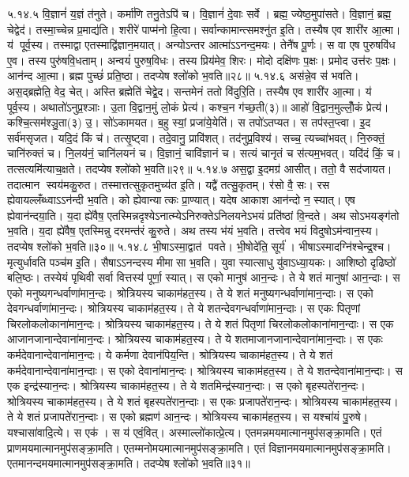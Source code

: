 ५.१४.५
वि॒ज्ञानं॑ य॒ज्ञं त॑नुते। कर्मा॑णि तनु॒तेऽपि॑ च। वि॒ज्ञानं॑ दे॒वाः सर्वे। ब्रह्म॒ ज्येष्ठ॒मुपा॑सते। वि॒ज्ञानं॒ ब्रह्म॒ चेद्वेद॑। तस्मा॒च्चेन्न प्र॒माद्य॑ति। शरीरे॑ पाप्म॑नो हि॒त्वा। सर्वान्कामान्त्समश्नु॑त इ॒ति। तस्यैष एव शारी॑र आ॒त्मा। य॑ पूर्व॒स्य। तस्माद्वा एतस्माद्वि॑ज्ञान॒मयात्। अन्योऽन्तर आत्मा॑ऽऽनन्द॒मयः। तेनै॑ष पू॒र्णः। स वा एष पुरुषवि॑ध ए॒व। तस्य पुरु॑षवि॒धताम्। अन्वयं॑ पुरुष॒विधः। तस्य प्रिय॑मेव॒ शिरः। मोदो दक्षि॑णः प॒क्षः। प्रमोद उत्त॑रः प॒क्षः। आन॑न्द आ॒त्मा। ब्रह्म पुच्छं॑ प्रति॒ष्ठा। तदप्येष श्लो॑को भ॒वति॥२८॥
५.१४.६
अस॑न्ने॒व स॑ भवति। अस॒द्ब्रह्मेति॒ वेद॒ चेत्। अस्ति ब्रह्मेति॑ चेद्वे॒द। सन्तमेनं ततो वि॑दुरि॒ति। तस्यैष एव शारी॑र आ॒त्मा। य॑ पूर्व॒स्य। अथातो॑ऽनुप्र॒श्ञाः। उ॒ता वि॒द्वान॒मुं लो॒कं प्रेत्य॑। कश्च॒न ग॑च्छ॒ती(३)॥ आहो॑ वि॒द्वान॒मुल्लोँ॒कं प्रेत्य॑। कश्चि॒त्सम॑श्ञु॒ता(३) उ॒। सो॑ऽकामयत। ब॒हु स्यां॒ प्रजा॑ये॒येति॑। स तपो॑ऽतप्यत। स तप॑स्त॒प्त्वा। इ॒द सर्व॑मसृजत। यदि॒दं किं च॑। तत्सृ॒ष्ट्वा। तदे॒वानु॒ प्रावि॑शत्। तद॑नुप्र॒विश्य॑। सच्च॒ त्यच्चा॑भवत्। नि॒रुक्तं॒ चानि॑रुक्तं च। नि॒लय॑नं॒ चानि॑लयनं च। वि॒ज्ञानं॒ चावि॑ज्ञानं च। सत्यं चानृतं च स॑त्यम॒भवत्। यदि॑दं किं॒ च। तत्सत्यमि॑त्याच॒क्षते। तदप्येष श्लो॑को भ॒वति॥२९॥
५.१४.७
अस॒द्वा इ॒दमग्र॑ आसीत्। ततो॒ वै सद॑जायत। तदात्मान स्वय॑मकु॒रुत। तस्मात्तत्सुकृतमुच्य॑त इ॒ति। यद्वै॑ तत्सु॒कृतम्। र॑सो वै॒ सः। रस ह्येवायल्लँब्ध्वाऽऽन॑न्दी भ॒वति। को ह्येवान्यात्कः प्रा॒ण्यात्। यदेष आकाश आन॑न्दो न॒ स्यात्। एष ह्येवान॑न्दया॒ति। य॒दा ह्ये॑वैष॒ एतस्मिन्नदृश्येऽनात्म्येऽनिरुक्तेऽनिलयनेऽभयं प्रति॑ष्ठां  वि॒न्दते। अथ सोऽभयङ्ग॑तो भ॒वति। य॒दा ह्ये॑वैष॒ एतस्मिन्नु दरमन्त॑रं कु॒रुते। अथ तस्य भ॑यं भ॒वति। तत्त्वेव भयं  विदुषोऽम॑न्वान॒स्य। तदप्येष श्लो॑को भ॒वति॥३०॥
५.१४.८
भी॒षाऽस्मा॒द्वात॑ पवते। भी॒षोदे॑ति॒ सूर्य॑। भीषाऽस्मादग्नि॑श्चेन्द्र॒श्च। मृत्युर्धावति पञ्च॑म इ॒ति। सैषाऽऽनन्दस्य मीमासा भ॒वति। युवा स्यात्साधु यु॑वाऽध्या॒यकः। आशिष्ठो दृढिष्ठो॑ बलि॒ष्ठः। तस्येयं पृथिवी सर्वा वित्तस्य॑ पूर्णा॒ स्यात्। स एको मानुष॑ आन॒न्दः। ते ये शतं मानुषा॑ आन॒न्दाः। स एको मनुष्यगन्धर्वाणा॑मान॒न्दः। श्रोत्रियस्य चाकाम॑हत॒स्य। ते ये शतं मनुष्यगन्धर्वाणा॑मान॒न्दाः। स एको देवगन्धर्वाणा॑मान॒न्दः। श्रोत्रियस्य चाकाम॑हत॒स्य। ते ये शतन्देवगन्धर्वाणा॑मान॒न्दाः। स एकः पितृणां चिरलोकलोकाना॑मान॒न्दः। श्रोत्रियस्य चाकाम॑हत॒स्य। ते ये शतं पितृणां चिरलोकलोकाना॑मान॒न्दाः। स एक आजानजानान्देवाना॑मान॒न्दः। श्रोत्रियस्य चाकाम॑हत॒स्य। ते ये शतमाजानजानान्देवाना॑मान॒न्दाः। स एकः कर्मदेवानान्देवाना॑मान॒न्दः। ये कर्मणा देवान॑पिय॒न्ति। श्रोत्रियस्य चाकाम॑हत॒स्य। ते ये शतं कर्मदेवानान्देवाना॑मान॒न्दाः। स एको देवाना॑मान॒न्दः। श्रोत्रियस्य चाकाम॑हत॒स्य। ते ये शतन्देवाना॑मान॒न्दाः। स एक इन्द्र॑स्यान॒न्दः। श्रोत्रियस्य चाकाम॑हत॒स्य। ते ये शतमिन्द्र॑स्यान॒न्दाः। स एको बृहस्पते॑रान॒न्दः। श्रोत्रियस्य चाकाम॑हत॒स्य। ते ये शतं बृहस्पते॑रान॒न्दाः। स एकः प्रजापते॑रान॒न्दः। श्रोत्रियस्य चाकाम॑हत॒स्य। ते ये शतं प्रजापते॑रान॒न्दाः। स एको ब्रह्मण॑ आन॒न्दः। श्रोत्रियस्य चाकाम॑हत॒स्य। स यश्चा॑यं पु॒रुषे। यश्चासा॑वादि॒त्ये। स एक॑। स य॑ एवं॒वित्। अस्माल्लो॑कात्प्रे॒त्य। एतमन्नमयमात्मानमुप॑सङ्क्रा॒मति। एतं प्राणमयमात्मानमुप॑सङ्क्रा॒मति। एतम्मनोमयमात्मानमुप॑सङ्क्रा॒मति। एतं विज्ञानमयमात्मानमुप॑सङ्क्रा॒मति। एतमानन्दमयमात्मानमुप॑सङ्क्रा॒मति। तदप्येष श्लो॑को भ॒वति॥३१॥
